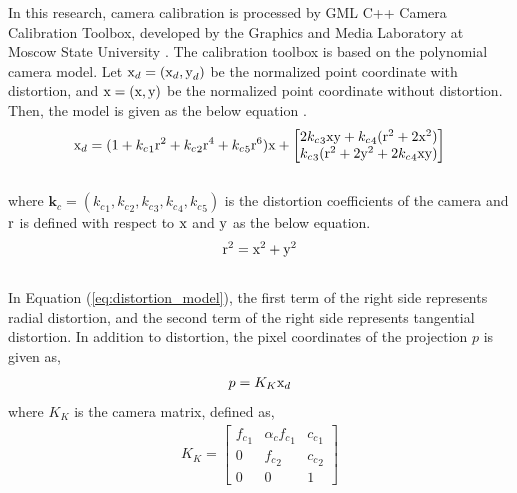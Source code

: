 In this research, camera calibration is processed by GML C++ Camera Calibration Toolbox, developed by the Graphics and Media Laboratory at Moscow State University \cite{gml}. The calibration toolbox is based on the polynomial camera model. Let \( {\boldsymbol {\text x}}_d = ({\text x}_d, {\text y}_d) \) be the normalized point coordinate with distortion, and \( {\boldsymbol {\text x}} =  ({\text x}, {\text y}) \) be the normalized point coordinate without distortion. Then, the model is given as the below equation \cite{caltech_calib}.\\
\begin{equation}
\label{eq:distortion_model}
\begin{aligned}
{\text x}_d = (1 + {k_c}_1 {\text r}^2 + {k_c}_2 {\text r}^4 + {k_c}_5 {\text r}^6 ) {\boldsymbol {\text x}} + 
\begin{bmatrix}
2 {k_c}_3 {\text x} {\text y} + {k_c}_4 ({\text r}^2 + 2 {\text x}^2) \\
{k_c}_3 ({\text r}^2 + 2 {\text y}^2 + 2 {k_c}_4 {\text x} {\text y})
\end{bmatrix}
\end{aligned}
\end{equation}\\
where \({\boldsymbol k}_c = ( {k_c}_1, {k_c}_2, {k_c}_3, {k_c}_4, {k_c}_5 )\) is the distortion coefficients of the camera and \(\text r\) is defined with respect to \(\text x\) and \(\text y\) as the below equation.
\begin{equation}
\begin{aligned}
{\text r}^2 = {\text x}^2 + {\text y}^2
\end{aligned}
\end{equation}\\
In Equation (\ref{eq:distortion_model}), the first term of the right side represents radial distortion, and the second term of the right side represents tangential distortion. In addition to distortion, the pixel coordinates of the projection \(p\) is given as,
\begin{equation}
\begin{aligned}
p = K_K {\boldsymbol {\text x}}_d
\end{aligned}
\end{equation}
where \(K_K\) is the camera matrix, defined as,
\begin{equation}
\begin{aligned}
K_K = 
\begin{bmatrix}
{f_c}_1 & \alpha_c {f_c}_1 & {c_c}_1 \\
0 & {f_c}_2 & {c_c}_2 \\
0 & 0 & 1
\end{bmatrix}
\end{aligned}
\end{equation}\\
